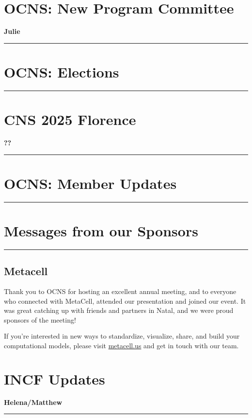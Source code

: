 \documentclass[11pt,a4paper,oneside]{article}
\begin{document}
\newpage
\section*{OCNS: New Program Committee}%
\textbf{\large Julie\\}
\rule{\textwidth}{0.4pt}
\lipsum[1-3]

\newpage
\section*{OCNS: Elections}%
\rule{\textwidth}{0.4pt}
\lipsum[1-3]

\newpage
\section*{CNS 2025 Florence}%
\textbf{\large ??\\}
\rule{\textwidth}{0.4pt}
\lipsum[1-3]

\newpage
\section*{OCNS: Member Updates}%
\rule{\textwidth}{0.4pt}
\lipsum[1-3]


\newpage
\section*{Messages from our Sponsors}%
\rule{\textwidth}{0.4pt}
\subsection*{Metacell}%
\begin{displayquote}
  Thank you to OCNS for hosting an excellent annual meeting, and to everyone who connected with MetaCell, attended our presentation and joined our event.
  It was great catching up with friends and partners in Natal, and we were proud sponsors of the meeting!

  If you're interested in new ways to standardize, visualize, share, and build your computational models, please visit \url{metacell.us} and get in touch with our team.
\end{displayquote}

\newpage
\section*{INCF Updates}%
\textbf{\large Helena/Matthew\\}
\rule{\textwidth}{0.4pt}
\lipsum[1-3]
\end{document}
